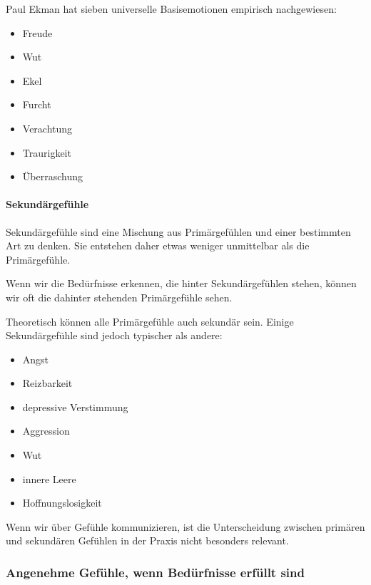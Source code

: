 Paul Ekman\cite{ekman-emotions} hat sieben universelle Basisemotionen empirisch nachgewiesen:

\begin{itemize}
  \item Freude
  \item Wut
  \item Ekel
  \item Furcht
  \item Verachtung
  \item Traurigkeit
  \item Überraschung
\end{itemize}

\paragraph{Sekundärgefühle}

Sekundärgefühle sind eine Mischung aus Primärgefühlen und einer bestimmten Art zu denken. Sie entstehen daher etwas weniger unmittelbar als die Primärgefühle.

Wenn wir die Bedürfnisse erkennen, die hinter Sekundärgefühlen stehen, können wir oft die dahinter stehenden Primärgefühle sehen.

Theoretisch können alle Primärgefühle auch sekundär sein. Einige Sekundärgefühle sind jedoch typischer als andere:

\begin{itemize}
 \item Angst
 \item Reizbarkeit
 \item depressive Verstimmung
 \item Aggression
 \item Wut
 \item innere Leere
 \item Hoffnungslosigkeit
\end{itemize}

Wenn wir über Gefühle kommunizieren, ist die Unterscheidung zwischen primären und sekundären Gefühlen in der Praxis nicht besonders relevant.

\subsubsection{Angenehme Gefühle, wenn Bedürfnisse erfüllt sind}
\label{gefuehle-liste}
\label{angenehme-gefuehle}

